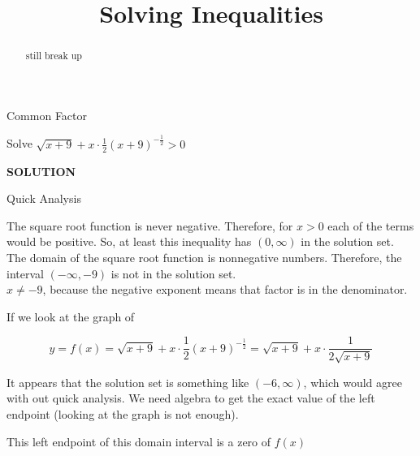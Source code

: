 \documentclass{ximera}
\title{Solving Inequalities}
\begin{document}
\begin{abstract}
still break up
\end{abstract}
\maketitle









\begin{example}  Common Factor


Solve $\sqrt{x+9} + x \cdot \frac{1}{2} (x+9)^{-\tfrac{1}{2}} > 0$



\textbf{\textcolor{purple!50!blue!90!black}{SOLUTION}}




\begin{observation} Quick Analysis


The square root function is never negative.  Therefore, for $x > 0$ each of the terms would be positive.  So, at least this inequality has $(0, \infty)$ in the solution set.  \\


The domain of the square root function is nonnegative numbers.  Therefore, the interval $(-\infty, -9)$ is not in the solution set.   \\


$x \ne -9$, because the negative exponent means that factor is in the denominator.

\end{observation}



If we look at the graph of  

\[
y = f(x) = \sqrt{x+9} + x \cdot \frac{1}{2} (x+9)^{-\tfrac{1}{2}} = \sqrt{x+9} + x \cdot \frac{1}{2 \sqrt{x+9}} 
\]




\begin{center}
\end{center}




It appears that the solution set is something like  $(-6, \infty)$, which would agree with out quick analysis.  We need algebra to get the exact value of the left endpoint (looking at the graph is not enough).


This left endpoint of this domain interval is a zero of $f(x)$ \\ 







\end{example}
\end{document}
